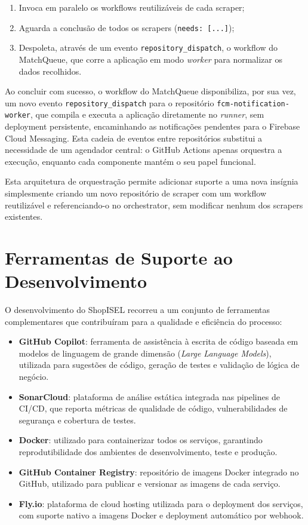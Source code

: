 \begin{enumerate}
    \item Invoca em paralelo os workflows reutilizáveis de cada scraper;
    \item Aguarda a conclusão de todos os scrapers (\texttt{needs: [...]});
    \item Despoleta, através de um evento \texttt{repository\_dispatch}, o workflow do MatchQueue, que corre a aplicação em modo \textit{worker} para normalizar os dados recolhidos.
\end{enumerate}

Ao concluir com sucesso, o workflow do MatchQueue disponibiliza, por sua vez, um novo evento \texttt{repository\_dispatch} para o repositório \texttt{fcm-notification-worker}, que compila e executa a aplicação diretamente no \textit{runner}, sem deployment persistente, encaminhando as notificações pendentes para o Firebase Cloud Messaging. Esta cadeia de eventos entre repositórios substitui a necessidade de um agendador central: o GitHub Actions apenas orquestra a execução, enquanto cada componente mantém o seu papel funcional.

Esta arquitetura de orquestração permite adicionar suporte a uma nova insígnia simplesmente criando um novo repositório de scraper com um workflow reutilizável e referenciando-o no orchestrator, sem modificar nenhum dos scrapers existentes.

\section{Ferramentas de Suporte ao Desenvolvimento}
\label{sec:5.5}

O desenvolvimento do ShopISEL recorreu a um conjunto de ferramentas complementares que contribuíram para a qualidade e eficiência do processo:

\begin{itemize}
    \item \textbf{GitHub Copilot}: ferramenta de assistência à escrita de código baseada em modelos de linguagem de grande dimensão (\textit{Large Language Models}), utilizada para sugestões de código, geração de testes e validação de lógica de negócio.
    \item \textbf{SonarCloud}: plataforma de análise estática integrada nas pipelines de \ac{CI/CD}, que reporta métricas de qualidade de código, vulnerabilidades de segurança e cobertura de testes.
    \item \textbf{Docker}: utilizado para containerizar todos os serviços, garantindo reprodutibilidade dos ambientes de desenvolvimento, teste e produção.
    \item \textbf{GitHub Container Registry}: repositório de imagens Docker integrado no GitHub, utilizado para publicar e versionar as imagens de cada serviço.
    \item \textbf{Fly.io}: plataforma de cloud hosting utilizada para o deployment dos serviços, com suporte nativo a imagens Docker e deployment automático por webhook.
\end{itemize}

